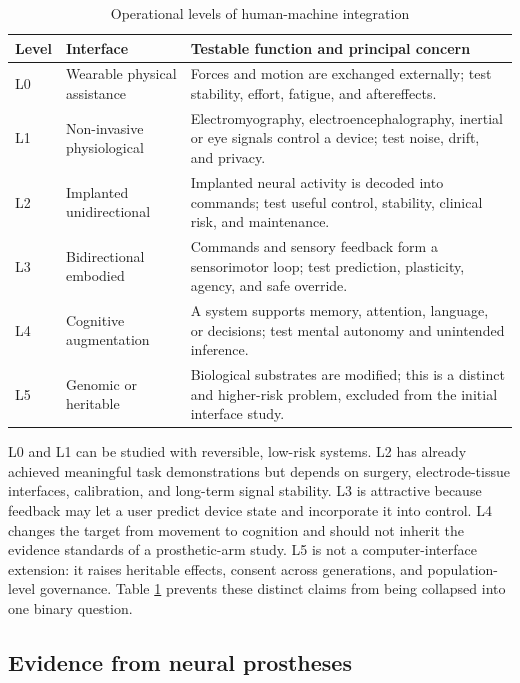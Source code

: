 \documentclass[conference]{IEEEtran}
\begin{document}
\begin{table}[t]
\caption{Operational levels of human-machine integration}
\label{tab:levels}
\centering
\small
\begin{tabular}{p{}p{}p{}}
\toprule
Level & Interface & Testable function and principal concern\\
\midrule
L0 & Wearable physical assistance & Forces and motion are exchanged externally; test stability, effort, fatigue, and aftereffects.\\
L1 & Non-invasive physiological & Electromyography, electroencephalography, inertial or eye signals control a device; test noise, drift, and privacy.\\
L2 & Implanted unidirectional & Implanted neural activity is decoded into commands; test useful control, stability, clinical risk, and maintenance.\\
L3 & Bidirectional embodied & Commands and sensory feedback form a sensorimotor loop; test prediction, plasticity, agency, and safe override.\\
L4 & Cognitive augmentation & A system supports memory, attention, language, or decisions; test mental autonomy and unintended inference.\\
L5 & Genomic or heritable & Biological substrates are modified; this is a distinct and higher-risk problem, excluded from the initial interface study.\\
\bottomrule
\end{tabular}
\end{table}

L0 and L1 can be studied with reversible, low-risk systems. L2 has already achieved meaningful task demonstrations but depends on surgery, electrode-tissue interfaces, calibration, and long-term signal stability. L3 is attractive because feedback may let a user predict device state and incorporate it into control. L4 changes the target from movement to cognition and should not inherit the evidence standards of a prosthetic-arm study. L5 is not a computer-interface extension: it raises heritable effects, consent across generations, and population-level governance. Table \ref{tab:levels} prevents these distinct claims from being collapsed into one binary question.

\subsection{Evidence from neural prostheses}
\end{document}
